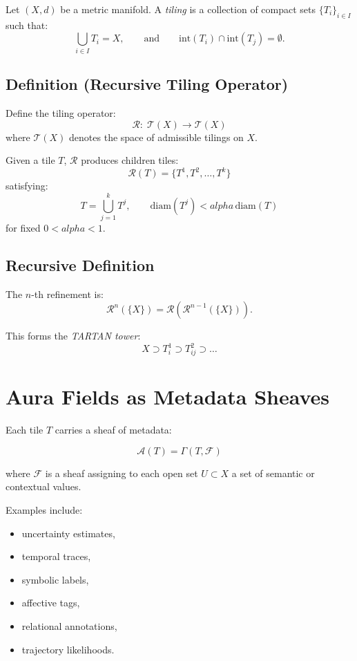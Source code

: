 \documentclass[12pt,oneside]{book}
\theoremstyle{plain}
\theoremstyle{definition}
\def\alpha{alpha}%
\begin{document}
Let $(X, d)$ be a metric manifold.
A \emph{tiling} is a collection of compact sets $\{T_i\}_{i \in I}$ such that:
\[
\bigcup_{i\in I} T_i = X, \qquad \text{and} \qquad
\text{int}(T_i) \cap \text{int}(T_j) = \emptyset.
\]

\subsection{Definition (Recursive Tiling Operator)}
Define the tiling operator:
\[
\mathcal{R}: \; \mathcal{T}(X) \to \mathcal{T}(X)
\]
where $\mathcal{T}(X)$ denotes the space of admissible tilings on $X$.

Given a tile $T$, $\mathcal{R}$ produces children tiles:
\[
\mathcal{R}(T) = \{T^1, T^2, \dots, T^k\}
\]
satisfying:
\[
T = \bigcup_{j=1}^k T^j, \qquad
\text{diam}(T^j) < \alpha\,\text{diam}(T)
\]
for fixed $0 < \alpha < 1$.

\subsection{Recursive Definition}
The $n$-th refinement is:
\[
\mathcal{R}^n(\{X\}) = \mathcal{R}(\mathcal{R}^{n-1}(\{X\})).
\]

This forms the \emph{TARTAN tower}:
\[
X \supset T_i^1 \supset T_{ij}^2 \supset \dots
\]

\section{Aura Fields as Metadata Sheaves}

Each tile $T$ carries a sheaf of metadata:

\begin{equation}
\mathcal{A}(T)
=
\Gamma(T, \mathcal{F})
\end{equation}

where $\mathcal{F}$ is a sheaf assigning to each open set $U \subset X$ a set of
semantic or contextual values.

Examples include:

\begin{itemize}
    \item uncertainty estimates,
    \item temporal traces,
    \item symbolic labels,
    \item affective tags,
    \item relational annotations,
    \item trajectory likelihoods.
\end{itemize}
\end{document}

